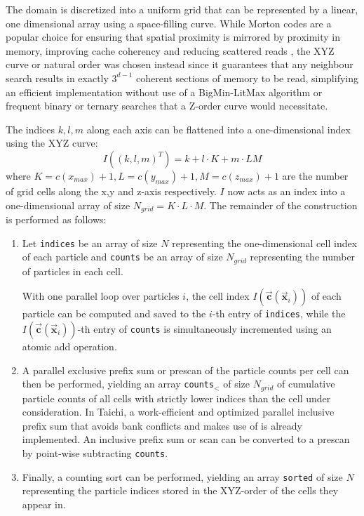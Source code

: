 \documentclass[oneside, a4paper]{book}
\newcommand\vek[1]{\vec{\bm{#1}}}
\newcommand\br[1]{\left(#1\right)}
\begin{document}
\begin{appendices}
    The domain is discretized into a uniform grid that can be represented by a linear, one dimensional array using a space-filling curve. While Morton codes are a popular choice \autocite{compressed-neighbour-lists} for ensuring that spatial proximity is mirrored by proximity in memory, improving cache coherency and reducing scattered reads \autocite{hoetzlein-rama-counting-sort}, the XYZ curve or natural order was chosen instead since it guarantees that any neighbour search results in exactly $3^{d-1}$ coherent sections of memory to be read, simplifying an efficient implementation without use of a BigMin-LitMax algorithm \autocite{bigminlitmax} or frequent binary or ternary searches that a Z-order curve would necessitate.
    
    The indices $k,l,m$ along each axis can be flattened into a one-dimensional index using the XYZ curve:
    \begin{equation}\label{eq:counting-sort-xyz}
      I\br{\br{k,l,m}^T} = k + l\cdot K + m\cdot LM
    \end{equation}
    where $K=c(x_{max})+1, L=c(y_{max})+1, M=c(z_{max})+1$ are the  number of grid cells along the x,y and z-axis respectively. $I$ now acts as an index into a one-dimensional array of size $N_{grid} = K\cdot L\cdot M$. The remainder of the construction is performed as follows:
    \begin{enumerate}
      \item Let \texttt{indices} be an array of size $N$ representing the one-dimensional cell index of each particle and \texttt{counts} be an array of size $N_{grid}$ representing the number of particles in each cell.

      With one parallel loop over particles $i$, the cell index $I\br{\vek{c}(\vek{x}_i)}$ of each particle can be computed and saved to the $i$-th entry of \texttt{indices}, while the $I\br{\vek{c}(\vek{x}_i)}$-th entry of \texttt{counts} is simultaneously incremented using an atomic add operation.
      \item A parallel exclusive prefix sum or prescan of the particle counts per cell can then be performed, yielding an array \texttt{counts}$_<$ of size $N_{grid}$ of cumulative particle counts of all cells with strictly lower indices than the cell under consideration. In Taichi, a work-efficient and optimized parallel inclusive prefix sum that avoids bank conflicts \autocite{parallel-prefix-scan} and makes use of \autocite[Blelloch scans]{blelloch-scans} is already implemented. An inclusive prefix sum or scan can be converted to a prescan by point-wise subtracting \texttt{counts}.
      \item Finally, a counting sort can be performed, yielding an array \texttt{sorted} of size $N$ representing the particle indices stored in the XYZ-order of the cells they appear in.
      

\end{enumerate}
\end{appendices}
\end{document}
